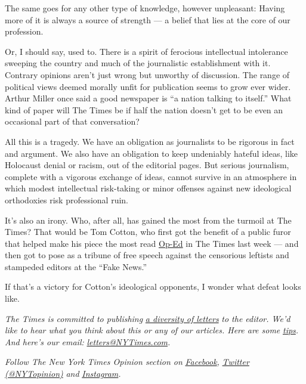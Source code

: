 The same goes for any other type of knowledge, however unpleasant:
Having more of it is always a source of strength --- a belief that lies
at the core of our profession.

Or, I should say, used to. There is a spirit of ferocious intellectual
intolerance sweeping the country and much of the journalistic
establishment with it. Contrary opinions aren't just wrong but unworthy
of discussion. The range of political views deemed morally unfit for
publication seems to grow ever wider. Arthur Miller once said a good
newspaper is ``a nation talking to itself.'' What kind of paper will The
Times be if half the nation doesn't get to be even an occasional part of
that conversation?

All this is a tragedy. We have an obligation as journalists to be
rigorous in fact and argument. We also have an obligation to keep
undeniably hateful ideas, like Holocaust denial or racism, out of the
editorial pages. But serious journalism, complete with a vigorous
exchange of ideas, cannot survive in an atmosphere in which modest
intellectual risk-taking or minor offenses against new ideological
orthodoxies risk professional ruin.

It's also an irony. Who, after all, has gained the most from the turmoil
at The Times? That would be Tom Cotton, who first got the benefit of a
public furor that helped make his piece the most read
\href{https://www.nytimes3xbfgragh.onion/2020/06/03/opinion/tom-cotton-protests-military.html}{Op-Ed}
in The Times last week --- and then got to pose as a tribune of free
speech against the censorious leftists and stampeded editors at the
``Fake News.''

If that's a victory for Cotton's ideological opponents, I wonder what
defeat looks like.

\emph{The Times is committed to publishing}
\href{https://www.nytimes3xbfgragh.onion/2019/01/31/opinion/letters/letters-to-editor-new-york-times-women.html}{\emph{a
diversity of letters}} \emph{to the editor. We'd like to hear what you
think about this or any of our articles. Here are some}
\href{https://help.nytimes3xbfgragh.onion/hc/en-us/articles/115014925288-How-to-submit-a-letter-to-the-editor}{\emph{tips}}\emph{.
And here's our email:}
\href{mailto:letters@NYTimes.com}{\emph{letters@NYTimes.com}}\emph{.}

\emph{Follow The New York Times Opinion section on}
\href{https://www.facebookcorewwwi.onion/nytopinion}{\emph{Facebook}}\emph{,}
\href{http://twitter.com/NYTOpinion}{\emph{Twitter (@NYTopinion)}}
\emph{and}
\href{https://www.instagram.com/nytopinion/}{\emph{Instagram}}\emph{.}

